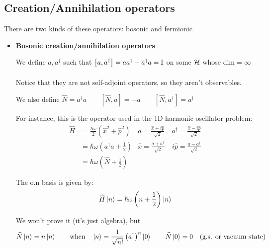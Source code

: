 
\subsection{Creation/Annihilation operators}
There are two kinds of these operators: bosonic and fermionic
\begin{itemize}
    \item \textbf{Bosonic creation/annihilation operators}
    
    We define $a, a^\dag$ such that $\left[a, a^\dag\right] = aa^\dag - a^\dag a = \mathbb{I}$ on some $\mathcal{H}$ whose dim$=\infty$\\
    \\
    Notice that they are not self-adjoint operators, so they aren't observables.

    We also define $\widehat N = a^\dag a \qquad \left[\widehat N, a \right] = -a \qquad \left[\widehat N, a^\dag\right] = a^\dag$
    
    For instance, this is the operator used in the 1D harmonic oscillator problem:
    \begin{align*}
    \widehat H &= \frac{\hbar\omega}2 \left(\hat x^2 + \hat p^2\right) &a = \frac{\hat x + i \hat p}{\sqrt 2} \quad a^\dag = \frac{\hat x - i \hat p}{\sqrt2} \\
    &= \hbar \omega \left(a^\dag a + \frac 12\right) &\hat x = \frac{a+a^\dag}{\sqrt2} \quad i\hat p = \frac{a- a^\dag}{\sqrt2} \\
    &= \hbar \omega \left(\widehat N + \frac 12\right)
    \end{align*}

    The o.n basis is given by:
    $$ \widehat H \left|n\right\rangle = \hbar \omega \left(n + \frac12\right) \left|n\right\rangle$$
    
    We won't prove it (it's just algebra), but 
    $$\widehat N \left|n\right\rangle = n\left|n\right\rangle  \qquad \text{when} \quad \left|n\right\rangle = \frac1{\sqrt{n!}}\left(a^\dag\right)^n \left|0\right\rangle \qquad \widehat N \left|0\right\rangle = 0 \quad \text{(g.s. or vacuum state)}$$


\end{itemize}
